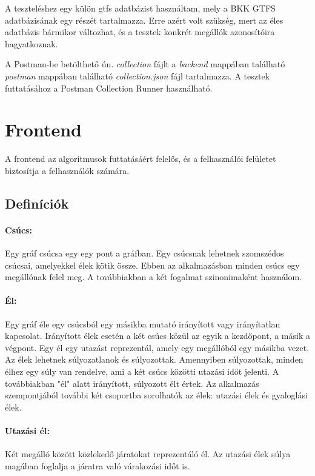 A teszteléshez egy külön gtfs adatbázist használtam, mely a BKK GTFS adatbázisának egy részét tartalmazza. Erre azért volt szükség, mert az éles adatbázis bármikor változhat, és a tesztek konkrét megállók azonosítóira hagyatkoznak.

A Postman-be betölthető ún. \textit{collection} fájlt a \textit{backend} mappában található \textit{postman} mappában található \textit{collection.json} fájl tartalmazza. A tesztek futtatásához a Postman Collection Runner használható.

\section{Frontend}

A frontend az algoritmusok futtatásáért felelős, és a felhasználói felületet biztosítja a felhasználók számára.

\subsection{Definíciók}

\paragraph{Csúcs:} Egy gráf csúcsa egy egy pont a gráfban. Egy csúcsnak lehetnek szomszédos csúcsai, amelyekkel élek kötik össze. Ebben az alkalmazásban minden csúcs egy megállónak felel meg. A továbbiakban a két fogalmat szinonimaként használom.

\paragraph{Él:} Egy gráf éle egy csúcsból egy másikba mutató irányított vagy irányítatlan kapcsolat. Irányított élek esetén a két csúcs közül az egyik a kezdőpont, a másik a végpont. Egy él egy utazást reprezentál, amely egy megállóból egy másikba vezet. Az élek lehetnek súlyozatlanok és súlyozottak. Amennyiben súlyozottak, minden élhez egy súly van rendelve, ami a két csúcs közötti utazási időt jelenti. A továbbiakban "él" alatt irányított, súlyozott élt értek. Az alkalmazás szempontjából további két csoportba sorolhatók az élek: utazási élek és gyaloglási élek.

\paragraph{Utazási él:} Két megálló között közlekedő járatokat reprezentáló él. Az utazási élek súlya magában foglalja a járatra való várakozási időt is.

